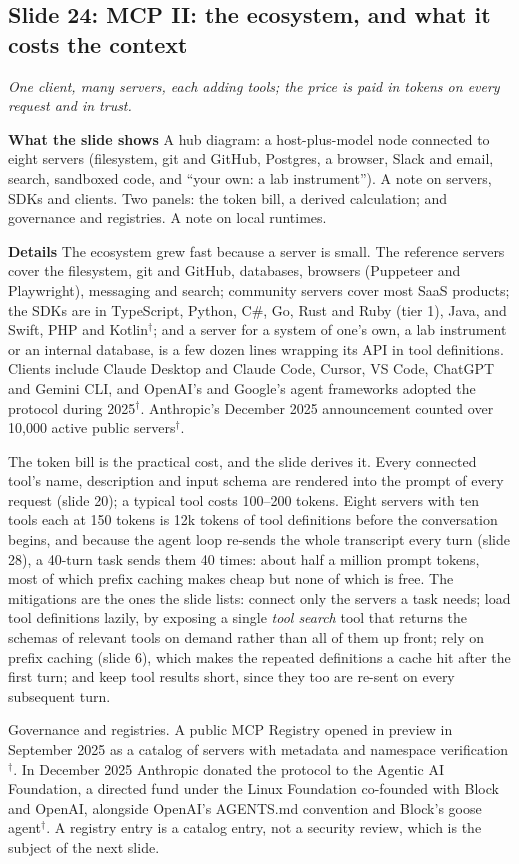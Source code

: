 \documentclass[11pt,letterpaper]{article}
\newcommand{\slide}[3]{%
  \subsection[Slide #1: #2]{Slide #1: #2}%
  {\color{muted}\itshape #3\par}\medskip}
\newcommand{\para}[1]{\medskip\noindent\textbf{#1}\quad}
\begin{document}
\slide{24}{MCP II: the ecosystem, and what it costs the context}{One client, many servers, each adding tools; the price is paid in tokens on every request and in trust.}

\para{What the slide shows} A hub diagram: a host-plus-model node connected to eight servers (filesystem, git and GitHub, Postgres, a browser, Slack and email, search, sandboxed code, and ``your own: a lab instrument''). A note on servers, SDKs and clients. Two panels: the token bill, a derived calculation; and governance and registries. A note on local runtimes.

\para{Details} The ecosystem grew fast because a server is small. The reference servers cover the filesystem, git and GitHub, databases, browsers (Puppeteer and Playwright), messaging and search; community servers cover most SaaS products; the SDKs are in TypeScript, Python, C\#, Go, Rust and Ruby (tier 1), Java, and Swift, PHP and Kotlin$^\dagger$; and a server for a system of one's own, a lab instrument or an internal database, is a few dozen lines wrapping its API in tool definitions. Clients include Claude Desktop and Claude Code, Cursor, VS Code, ChatGPT and Gemini CLI, and OpenAI's and Google's agent frameworks adopted the protocol during 2025$^\dagger$. Anthropic's December 2025 announcement counted over 10,000 active public servers$^\dagger$.

The token bill is the practical cost, and the slide derives it. Every connected tool's name, description and input schema are rendered into the prompt of every request (slide 20); a typical tool costs 100--200 tokens. Eight servers with ten tools each at 150 tokens is 12k tokens of tool definitions before the conversation begins, and because the agent loop re-sends the whole transcript every turn (slide 28), a 40-turn task sends them 40 times: about half a million prompt tokens, most of which prefix caching makes cheap but none of which is free. The mitigations are the ones the slide lists: connect only the servers a task needs; load tool definitions lazily, by exposing a single \emph{tool search} tool that returns the schemas of relevant tools on demand rather than all of them up front; rely on prefix caching (slide 6), which makes the repeated definitions a cache hit after the first turn; and keep tool results short, since they too are re-sent on every subsequent turn.

Governance and registries. A public MCP Registry opened in preview in September 2025 as a catalog of servers with metadata and namespace verification$^\dagger$. In December 2025 Anthropic donated the protocol to the Agentic AI Foundation, a directed fund under the Linux Foundation co-founded with Block and OpenAI, alongside OpenAI's AGENTS.md convention and Block's goose agent$^\dagger$. A registry entry is a catalog entry, not a security review, which is the subject of the next slide.
\end{document}
